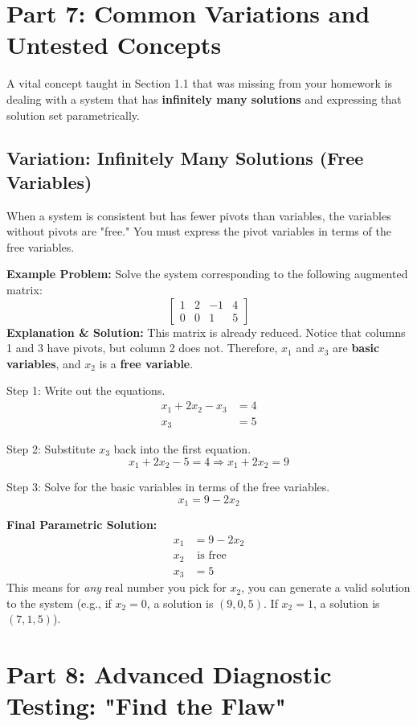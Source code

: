 \documentclass[11pt]{article}
\begin{document}
\newpage
\section{Part 7: Common Variations and Untested Concepts}

A vital concept taught in Section 1.1 that was missing from your homework is dealing with a system that has \textbf{infinitely many solutions} and expressing that solution set parametrically.

\subsection{Variation: Infinitely Many Solutions (Free Variables)}
When a system is consistent but has fewer pivots than variables, the variables without pivots are "free." You must express the pivot variables in terms of the free variables.

\textbf{Example Problem:} Solve the system corresponding to the following augmented matrix:
\[
\begin{bmatrix}
1 & 2 & -1 & 4 \\
0 & 0 & 1 & 5 
\end{bmatrix}
\]
\textbf{Explanation & Solution:}
This matrix is already reduced. Notice that columns 1 and 3 have pivots, but column 2 does not. Therefore, $x_1$ and $x_3$ are \textbf{basic variables}, and $x_2$ is a \textbf{free variable}.

Step 1: Write out the equations.
\begin{align*}
    x_1 + 2x_2 - x_3 &= 4 \\
    x_3 &= 5
\end{align*}

Step 2: Substitute $x_3$ back into the first equation.
\[ x_1 + 2x_2 - 5 = 4 \Rightarrow x_1 + 2x_2 = 9 \]

Step 3: Solve for the basic variables in terms of the free variables.
\[ x_1 = 9 - 2x_2 \]

\textbf{Final Parametric Solution:}
\begin{align*}
    x_1 &= 9 - 2x_2 \\
    x_2 &\text{ is free} \\
    x_3 &= 5
\end{align*}
This means for \textit{any} real number you pick for $x_2$, you can generate a valid solution to the system (e.g., if $x_2 = 0$, a solution is $(9, 0, 5)$. If $x_2 = 1$, a solution is $(7, 1, 5)$).

\newpage
\section{Part 8: Advanced Diagnostic Testing: "Find the Flaw"}
\end{document}
